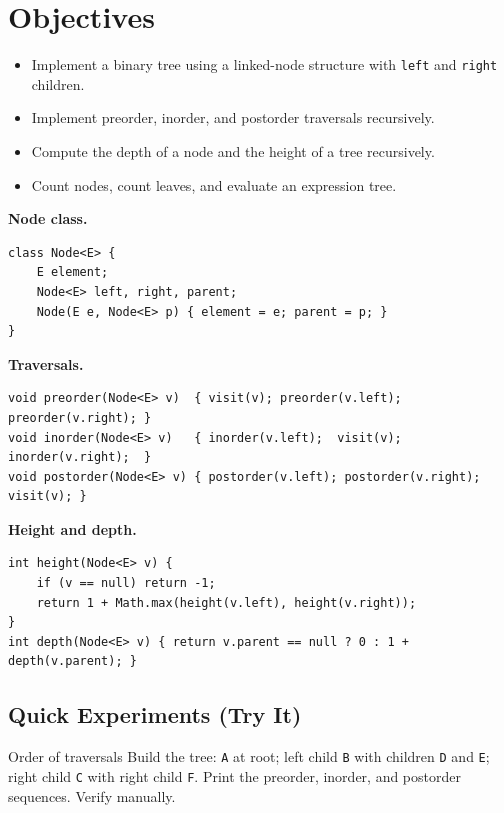 \documentclass[11pt]{article}
\begin{document}
\labheader

\section*{Objectives}
\begin{itemize}[leftmargin=*,nosep]
  \item Implement a binary tree using a linked-node structure with \texttt{left} and \texttt{right} children.
  \item Implement preorder, inorder, and postorder traversals recursively.
  \item Compute the depth of a node and the height of a tree recursively.
  \item Count nodes, count leaves, and evaluate an expression tree.
\end{itemize}

\begin{summary}
\textbf{Node class.}
\begin{lstlisting}
class Node<E> {
    E element;
    Node<E> left, right, parent;
    Node(E e, Node<E> p) { element = e; parent = p; }
}
\end{lstlisting}

\textbf{Traversals.}
\begin{lstlisting}
void preorder(Node<E> v)  { visit(v); preorder(v.left);  preorder(v.right); }
void inorder(Node<E> v)   { inorder(v.left);  visit(v); inorder(v.right);  }
void postorder(Node<E> v) { postorder(v.left); postorder(v.right); visit(v); }
\end{lstlisting}

\textbf{Height and depth.}
\begin{lstlisting}
int height(Node<E> v) {
    if (v == null) return -1;
    return 1 + Math.max(height(v.left), height(v.right));
}
int depth(Node<E> v) { return v.parent == null ? 0 : 1 + depth(v.parent); }
\end{lstlisting}
\end{summary}

\subsection*{Quick Experiments (Try It)}

\begin{tryit}{Order of traversals}
Build the tree: \texttt{A} at root; left child \texttt{B} with children \texttt{D} and \texttt{E};
right child \texttt{C} with right child \texttt{F}.
Print the preorder, inorder, and postorder sequences. Verify manually.
\end{tryit}
\end{document}

